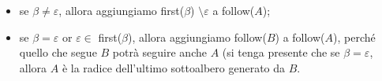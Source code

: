\documentclass[class=book, crop=false, oneside, 12pt]{standalone}
\begin{document}
\begin{itemize}
    \item se \(\beta \neq \varepsilon\), allora aggiungiamo first(\(\beta\)) \(\setminus \varepsilon\) a follow(\(A\));
    \item se \(\beta = \varepsilon\) or \(\varepsilon \in\) first(\(\beta\)), allora aggiungiamo follow(\(B\)) a follow(\(A\)), perché quello che segue \(B\) potrà seguire anche \(A\) (si tenga presente che se \(\beta = \varepsilon\), allora \(A\) è la radice dell'ultimo sottoalbero generato da \(B\).
\end{itemize}   
\end{document}
